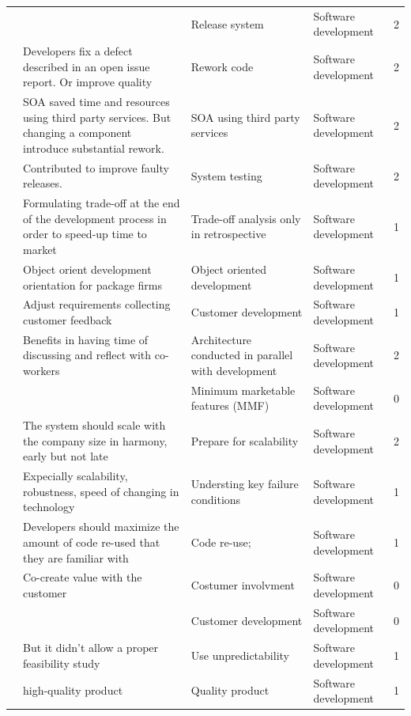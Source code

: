\documentclass[final,5p,times,twocolumn]{elsarticle}
\begin{document}
\begin{center}
\begin{longtable}{|p{0.4in}|p{3in}|p{1.3in}|p{1in}|p{0.3in}|}
\cite{Zettel2001} &       & Release system & Software development & 2 \\
\cite{Zettel2001} & Developers fix a defect described in an open issue report. Or improve quality & Rework code & Software development & 2 \\
\cite{Jansen2008} & SOA saved time and resources using third party services. But changing a component introduce substantial rework. & SOA using third party services & Software development & 2 \\
\cite{Kajko-Mattsson2008} & Contributed to improve faulty releases. & System testing & Software development & 2 \\
\cite{Camel1994a} & Formulating trade-off at the end of the development process in order to speed-up time to market & Trade-off analysis only in retrospective & Software development & 1 \\
\cite{Camel1994a} & Object orient development orientation for package firms & Object oriented development & Software development & 1 \\
\cite{Deakins2005} & Adjust requirements collecting customer feedback & Customer development & Software development & 1 \\
\cite{Ambler2002} & Benefits in having time of discussing and reflect with co-workers & Architecture conducted in parallel with development & Software development & 2 \\
\cite{Taipale2010} &       & Minimum marketable features (MMF) & Software development & 0 \\
\cite{Yoffie1999} & The system should scale with the company size in harmony, early but not late & Prepare for scalability & Software development & 2 \\
\cite{Mater2000} & Expecially scalability, robustness, speed of changing in technology & Understing key failure conditions & Software development & 1 \\
\cite{Sutton2000} & Developers should maximize the amount of code re-used that they are familiar with & Code re-use; & Software development & 1 \\
\cite{Su-Chan2007} & Co-create value with the customer & Costumer involvment & Software development & 0 \\
\cite{Taipale2010} &       & Customer development & Software development & 0 \\
\cite{Mirel2000} & But it didn't allow a proper feasibility study & Use unpredictability & Software development & 1 \\
\cite{Deakins2005} & high-quality product & Quality product & Software development & 1 \\

\end{longtable}
\end{center}
\end{document}
